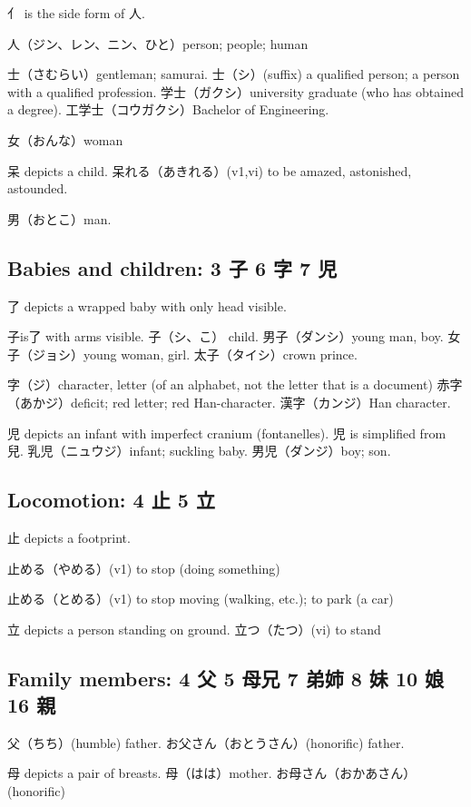 亻 is the side form of 人.

人（ジン、レン、ニン、ひと）person; people; human

士（さむらい）gentleman; samurai.
士（シ）(suffix)
a qualified person;
a person with a qualified profession.
学士（ガクシ）university graduate (who has obtained a degree).
工学士（コウガクシ）Bachelor of Engineering.

女（おんな）woman

呆 depicts a child.
呆れる（あきれる）(v1,vi) to be amazed, astonished, astounded.

男（おとこ）man.

\subsection{Babies and children: 3 子 6 字 7 児}

了 depicts a wrapped baby with only head visible.

子is了 with arms visible.
子（シ、こ） child.
男子（ダンシ）young man, boy.
女子（ジョシ）young woman, girl.
太子（タイシ）crown prince.

字（ジ）character, letter (of an alphabet, not the letter that is a document)
赤字（あかジ）deficit; red letter; red Han-character.
漢字（カンジ）Han character.

児 depicts an infant with imperfect cranium (fontanelles).
児 is simplified from 兒.
乳児（ニュウジ）infant; suckling baby.
男児（ダンジ）boy; son.

\subsection{Locomotion: 4 止 5 立}

止 depicts a footprint.

止める（やめる）(v1) to stop (doing something)

止める（とめる）(v1) to stop moving (walking, etc.); to park (a car)

立 depicts a person standing on ground.
立つ（たつ）(vi) to stand

\subsection{Family members: 4 父 5 母兄 7 弟姉 8 妹 10 娘 16 親}

父（ちち）(humble) father.
お父さん（おとうさん）(honorific) father.

母 depicts a pair of breasts.
母（はは）mother.
お母さん（おかあさん）(honorific)

